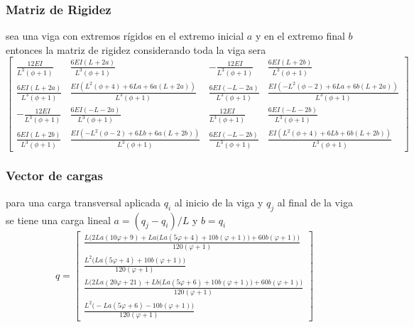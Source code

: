 \subsubsection{Matriz de Rigidez}
sea una viga con extremos rígidos en el extremo inicial $a$ y en el extremo final $b$ entonces la matriz de rigidez considerando toda la viga sera
\[
\left[
\begin{matrix}
\frac{12 E I}{L^{3} \left(\phi + 1\right)} & \frac{6 E I \left(L + 2 a\right)}{L^{3} \left(\phi + 1\right)} & - \frac{12 E I}{L^{3} \left(\phi + 1\right)} & \frac{6 E I \left(L + 2 b\right)}{L^{3} \left(\phi + 1\right)} \\[10pt]
\frac{6 E I \left(L + 2 a\right)}{L^{3} \left(\phi + 1\right)} & \frac{E I \left(L^{2} \left(\phi + 4\right) + 6 L a + 6 a \left(L + 2 a\right)\right)}{L^{3} \left(\phi + 1\right)} & \frac{6 E I \left(- L - 2 a\right)}{L^{3} \left(\phi + 1\right)} & \frac{E I \left(- L^{2} \left(\phi - 2\right) + 6 L a + 6 b \left(L + 2 a\right)\right)}{L^{3} \left(\phi + 1\right)} \\[10pt]
- \frac{12 E I}{L^{3} \left(\phi + 1\right)} & \frac{6 E I \left(- L - 2 a\right)}{L^{3} \left(\phi + 1\right)} & \frac{12 E I}{L^{3} \left(\phi + 1\right)} & \frac{6 E I \left(- L - 2 b\right)}{L^{3} \left(\phi + 1\right)} \\[10pt]
\frac{6 E I \left(L + 2 b\right)}{L^{3} \left(\phi + 1\right)} & \frac{E I \left(- L^{2} \left(\phi - 2\right) + 6 L b + 6 a \left(L + 2 b\right)\right)}{L^{3} \left(\phi + 1\right)} & \frac{6 E I \left(- L - 2 b\right)}{L^{3} \left(\phi + 1\right)} & \frac{E I \left(L^{2} \left(\phi + 4\right) + 6 L b + 6 b \left(L + 2 b\right)\right)}{L^{3} \left(\phi + 1\right)}
\end{matrix}
\right]
\]

\subsubsection{Vector de cargas}
para una carga transversal aplicada $q_i$ al inicio de la viga y $q_j$ al final de la viga se tiene una carga lineal
$a = (q_j-q_i)/L$ y $b=q_i$
\[
q =
\begin{bmatrix}
\frac{L \Big( 2La(10\varphi+9) + La\big(L a(5\varphi+4) + 10b(\varphi+1)\big) + 60b(\varphi+1) \Big)}{120(\varphi+1)} \\[8pt]
\frac{L^{2}\Big(L a(5\varphi+4) + 10b(\varphi+1)\Big)}{120(\varphi+1)} \\[8pt]
\frac{L \Big( 2La(20\varphi+21) + Lb\big(L a(5\varphi+6) + 10b(\varphi+1)\big) + 60b(\varphi+1) \Big)}{120(\varphi+1)} \\[8pt]
\frac{L^{2}\Big(-La(5\varphi+6) - 10b(\varphi+1)\Big)}{120(\varphi+1)}
\end{bmatrix}
\]

